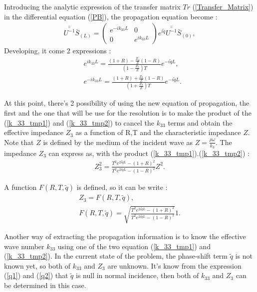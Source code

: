 \documentclass{article}
\begin{document}
    Introducing the analytic expression of the transfer matrix $Tr$ (\ref{Transfer_Matrix}) in the differential equation (\ref{PB}), the propagation equation become :
    \begin{align}
    \bar{\bar{U^{-1}}} \bar{S}_{(L)}= \begin{pmatrix}
                                   			e^{-ik_{33}L} & 0 \\ 0 & e^{ik_{33}L}
                                            \end{pmatrix}e^{i\tilde{q}} \bar{\bar{U^{-1}}} \bar{S}_{(0)}, 
   \end{align} 
    Developing, it come 2 expressions  :
    \begin{align}
	&e^{i k_{33}L}=\frac{(1+R)-\frac{Z_3}{Z}(1-R)}{(1-\frac{Z_3}{Z})T}e^{-i\tilde{q}L},\label{k_33_tmp1}\\
    &e^{-i k_{33}L}=\frac{(1+R)+\frac{Z_3}{Z}(1-R)}{(1+\frac{Z_3}{Z})T}e^{-i\tilde{q}L}.\label{k_33_tmp2}
    \end{align} 

    At this point, there's 2 possibility of using the new equation of propagation, the first and the one that will be use for the resolution is to make the product of the (\ref{k_33_tmp1}) and (\ref{k_33_tmp2}) to cancel the $k_{33}$ terms and obtain the effective impedance $Z_3$ as a function of R,T and the characteristic impedance $Z$. Note that $Z$ is defined by the medium of the incident wave as $Z=\frac{\rho \omega}{k_3}$.
    The impedance $Z_3$ can express as, with the product (\ref{k_33_tmp1}).(\ref{k_33_tmp2}) :
    \begin{align}
    Z_3^2=\frac{T^2e^{2i\tilde{q}L}-(1+R)^2}{T^2e^{2i\tilde{q}L}-(1-R)^2}Z^2\label{Z3}.
    \end{align}
    
    A function $F(R,T,\tilde{q})$ is defined, so it can be write :
    \begin{align}
        Z_3=F(R,T,\tilde{q}),\\
        F(R,T,\tilde{q})=\sqrt{\frac{T^2e^{2i\tilde{q}L}-(1+R)^2}{T^2e^{2i\tilde{q}L}-(1-R)^2}}1.
    \end{align}
    
    Another way of extracting the propagation information is to know the effective wave number $k_{33}$ using one of the two equation (\ref{k_33_tmp1}) and (\ref{k_33_tmp2}).
    In the current state of the problem, the phase-shift term $\tilde{q}$ is not known yet, so both of $k_{33}$ and $Z_3$ are unknown. It's know from the expression (\ref{q1}) and (\ref{q2}) that $\tilde{q}$ is null in normal incidence, then both of $k_{33}$ and $Z_3$ can be determined in this case. 
    
\end{document}
